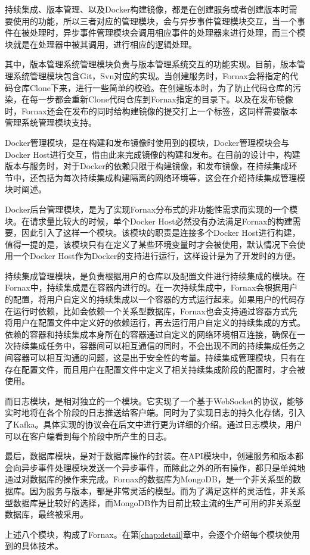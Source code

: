持续集成、版本管理、以及Docker构建镜像，都是在创建服务或者创建版本时需要使用的功能，所以三者对应的管理模块，会与异步事件管理模块交互，当一个事件在被处理时，异步事件管理模块会调用相应事件的处理器来进行处理，而三个模块就是在处理器中被其调用，进行相应的逻辑处理。

其中，版本管理系统管理模块负责与版本管理系统交互的功能实现。目前，版本管理系统管理模块包含Git，Svn对应的实现。当创建服务时，Fornax会将指定的代码仓库Clone下来，进行一些简单的校验。在创建版本时，为了防止代码仓库的污染，在每一步都会重新Clone代码仓库到Fornax指定的目录下。以及在发布镜像时，Fornax还会在发布的同时给构建镜像的提交打上一个标签，这同样需要版本管理系统管理模块支持。

Docker管理模块，是在构建和发布镜像时使用到的模块，Docker管理模块会与Docker Host进行交互，借由此来完成镜像的构建和发布。在目前的设计中，构建版本与服务时，对于Docker的依赖只限于构建镜像，和发布镜像，在持续集成环节中，还包括为每次持续集成构建隔离的网络环境等，这会在介绍持续集成管理模块时阐述。

Docker后台管理模块，是为了实现Fornax分布式的非功能性需求而实现的一个模块。在请求量比较大的时候，单个Docker Host必然没有办法满足Fornax的构建需要，因此引入了这样一个模块。该模块的职责是连接多个Docker Host进行构建，值得一提的是，该模块只有在定义了某些环境变量时才会被使用，默认情况下会使用一个Docker Host作为Docker的支持进行运行，这样设计是为了开发时的方便。

持续集成管理模块，是负责根据用户的仓库以及配置文件进行持续集成的模块。在Fornax中，持续集成是在容器内进行的。在一次持续集成中，Fornax会根据用户的配置，将用户自定义的持续集成以一个容器的方式运行起来。如果用户的代码存在运行时依赖，比如会依赖一个关系型数据库，Fornax也会支持通过容器方式先将用户在配置文件中定义好的依赖运行，再去运行用户自定义的持续集成的方式。依赖的容器和持续集成本身所在的容器通过自定义的网络环境相互连接，确保在一次持续集成任务中，容器间可以相互通信的同时，不会出现不同的持续集成任务之间容器可以相互沟通的问题，这是出于安全性的考量。持续集成管理模块，只有在存在配置文件，而且用户在配置文件中定义了相关持续集成阶段的配置时，才会被使用。

而日志模块，是相对独立的一个模块。它实现了一个基于WebSocket的协议，能够实时地将在各个阶段的日志推送给客户端。同时为了实现日志的持久化存储，引入了Kafka。具体实现的协议会在后文中进行更为详细的介绍。通过日志模块，用户可以在客户端看到每个阶段中所产生的日志。

最后，数据库模块，是对于数据库操作的封装。在API模块中，创建服务和版本都会向异步事件处理模块发送一个异步事件，而除此之外的所有操作，都只是单纯地通过对数据库的操作来完成。Fornax的数据库为MongoDB，是一个非关系型的数据库。因为服务与版本，都是非常灵活的模型。而为了满足这样的灵活性，非关系型数据库是比较好的选择，而MongoDB作为目前比较主流的生产可用的非关系型数据库，最终被采用。

上述八个模块，构成了Fornax。在第\ref{chap:detail}章中，会逐个介绍每个模块使用到的具体技术。
